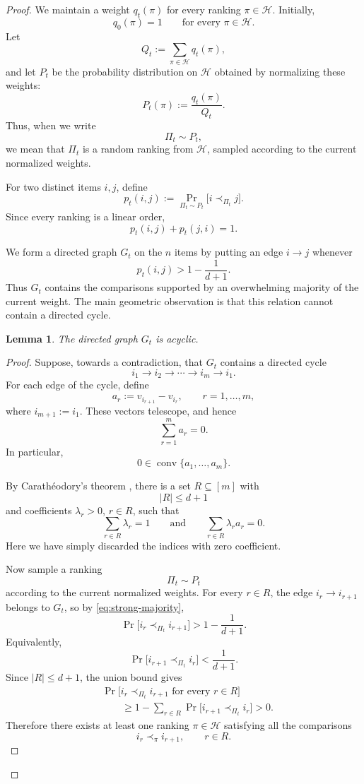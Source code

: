 \documentclass[11pt]{article}
\newtheorem{lemma}[theorem]{Lemma}
\theoremstyle{definition}
\theoremstyle{remark}
\begin{document}
\begin{proof}
We maintain a weight $q_t(\pi)$ for every ranking $\pi\in\mathcal H$.
Initially,
\[
    q_0(\pi)=1
    \qquad\text{for every }\pi\in\mathcal H.
\]
Let
\[
    Q_t:=\sum_{\pi\in\mathcal H}q_t(\pi),
\]
and let $P_t$ be the probability distribution on $\mathcal H$ obtained by
normalizing these weights:
\[
    P_t(\pi):=\frac{q_t(\pi)}{Q_t}.
    \tag{13}\label{eq:geometric-normalized-weights}
\]
Thus, when we write
\[
    \Pi_t\sim P_t,
\]
we mean that $\Pi_t$ is a random ranking from $\mathcal H$, sampled
according to the current normalized weights.

For two distinct items $i,j$, define
\[
    p_t(i,j)
    :=
    \Pr_{\Pi_t\sim P_t}
    \bigl[i\prec_{\Pi_t}j\bigr].
    \tag{14}\label{eq:geometric-pairwise-weight}
\]
Since every ranking is a linear order,
\[
    p_t(i,j)+p_t(j,i)=1.
\]

We form a directed graph $G_t$ on the $n$ items by putting an edge
$i\to j$ whenever
\[
    p_t(i,j)>1-\frac{1}{d+1}.
    \tag{15}\label{eq:strong-majority}
\]
Thus $G_t$ contains the comparisons supported by an overwhelming majority
of the current weight. The main geometric observation is that this relation
cannot contain a directed cycle.

\begin{lemma}
\label{lem:strong-majority-acyclic}
The directed graph $G_t$ is acyclic.
\end{lemma}

\begin{proof}
Suppose, towards a contradiction, that $G_t$ contains a directed cycle
\[
    i_1\to i_2\to\cdots\to i_m\to i_1.
\]
For each edge of the cycle, define
\[
    a_r:=v_{i_{r+1}}-v_{i_r},
    \qquad r=1,\ldots,m,
\]
where $i_{m+1}:=i_1$. These vectors telescope, and hence
\[
    \sum_{r=1}^m a_r=0.
\]
In particular,
\[
    0\in\operatorname{conv}\{a_1,\ldots,a_m\}.
\]

By Carath\'eodory's theorem \cite{Matousek2002}, there is a set
$R\subseteq[m]$ with
\[
    |R|\leq d+1
\]
and coefficients $\lambda_r>0$, $r\in R$, such that
\[
    \sum_{r\in R}\lambda_r=1
    \qquad\text{and}\qquad
    \sum_{r\in R}\lambda_r a_r=0.
    \tag{16}\label{eq:caratheodory-dependence}
\]
Here we have simply discarded the indices with zero coefficient.

Now sample a ranking
\[
    \Pi_t\sim P_t
\]
according to the current normalized weights. For every $r\in R$, the edge
$i_r\to i_{r+1}$ belongs to $G_t$, so by
\eqref{eq:strong-majority},
\[
    \Pr\bigl[i_r\prec_{\Pi_t}i_{r+1}\bigr]
    >
    1-\frac1{d+1}.
\]
Equivalently,
\[
    \Pr\bigl[i_{r+1}\prec_{\Pi_t}i_r\bigr]
    <
    \frac1{d+1}.
\]
Since $|R|\leq d+1$, the union bound gives
\begin{align*}
    &\Pr\bigl[
        i_r\prec_{\Pi_t}i_{r+1}
        \text{ for every }r\in R
    \bigr] \\
    &\qquad\geq
    1-
    \sum_{r\in R}
    \Pr\bigl[i_{r+1}\prec_{\Pi_t}i_r\bigr]
    >0.
\end{align*}
Therefore there exists at least one ranking $\pi\in\mathcal H$ satisfying
all the comparisons
\[
    i_r\prec_\pi i_{r+1},
    \qquad r\in R.
\]


\end{proof}
\end{proof}
\end{document}
